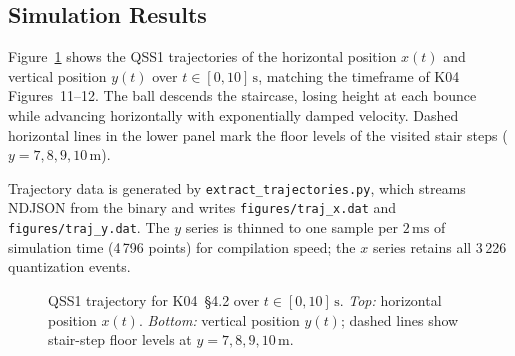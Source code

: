 \subsection*{Simulation Results}

Figure~\ref{fig:k04-trajectory} shows the QSS1 trajectories of the
horizontal position $x(t)$ and vertical position $y(t)$ over
$t\in[0,10]\,\text{s}$, matching the timeframe of K04 Figures~11--12.
The ball descends the staircase, losing height at each bounce while
advancing horizontally with exponentially damped velocity.
Dashed horizontal lines in the lower panel mark the floor levels of
the visited stair steps ($y = 7, 8, 9, 10$\,m).

Trajectory data is generated by \texttt{extract\_trajectories.py},
which streams NDJSON from the binary and writes
\texttt{figures/traj\_x.dat} and \texttt{figures/traj\_y.dat}.
The $y$ series is thinned to one sample per $2\,\text{ms}$ of
simulation time (4\,796 points) for compilation speed; the $x$ series
retains all 3\,226 quantization events.

\begin{figure}[h!]
\centering
{}
\caption{QSS1 trajectory for K04~§4.2 over $t\in[0,10]\,\text{s}$.
  \emph{Top:} horizontal position $x(t)$.
  \emph{Bottom:} vertical position $y(t)$; dashed lines show stair-step
  floor levels at $y=7,8,9,10$\,m.}
\label{fig:k04-trajectory}
\end{figure}
